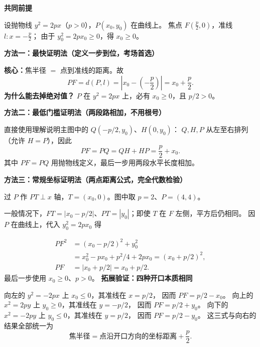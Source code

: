 \clearpage
\begin{proofbox}
  \textbf{\textcolor{CProof}{共同前提}}

  设抛物线 $y^2=2px$（$p>0$），$P(x_0,y_0)$ 在曲线上。
  焦点 $F(\frac p2,0)$，准线 $l:x=-\frac p2$；
  由于 $y_0^2=2px_0\ge0$，得 $x_0\ge0$。

  \medskip
  \textbf{\textcolor{CProof}{方法一：最快证明法（定义一步到位，考场首选）}}

  \textbf{核心：}焦半径 $=$ 点到准线的距离。故
  \[
    \boxed{PF=d(P,l)
    =\left|x_0-\left(-\frac p2\right)\right|
    =x_0+\frac p2}.
  \]
  \textbf{为什么能去掉绝对值？} $P$ 在 $y^2=2px$ 上，必有 $x_0\ge0$，且 $p/2>0$。



  \medskip
  \textbf{\textcolor{CProof}{方法二：最低门槛证明法（两段路相加，不用根号）}}


  直接使用理解说明主图中的 $Q(-p/2,y_0)$、$H(0,y_0)$：
  $Q,H,P$ 从左至右排列（允许 $H=P$），因此
  \[
    PF=PQ=QH+HP=\frac p2+x_0.
  \]
  其中 $PF=PQ$ 用抛物线定义，最后一步用两段水平长度相加。

  \medskip
\end{proofbox}
\clearpage
\begin{proofbox}
  \textbf{\textcolor{CProof}{方法三：常规坐标证明法（两点距离公式，完全代数检验）}}


  过 $P$ 作 $PT\perp x$ 轴，$T=(x_0,0)$。图中取 $p=2$、$P=(4,4)$。
  \begin{center}\end{center}
  一般情况下，$FT=|x_0-p/2|$、$PT=|y_0|$；即使 $T$ 在 $F$ 左侧，平方后仍相同。
  因 $P$ 在曲线上，代入 $y_0^2=2px_0$ 得


  \[
  \begin{aligned}
    PF^2&=(x_0-p/2)^2+y_0^2\\
        &=x_0^2-px_0+p^2/4+2px_0=(x_0+p/2)^2,\\
    PF&=|x_0+p/2|=\boxed{x_0+p/2}.
  \end{aligned}
  \]
  最后一步使用 $x_0\ge0$、$p>0$。
  \medskip
  \textbf{\textcolor{CProof}{拓展验证：四种开口本质相同}}

  向左的 $y^2=-2px$ 上 $x_0\le0$，其准线在 $x=p/2$，
  因而 $PF=p/2-x_0$。
  向上的 $x^2=2py$ 上 $y_0\ge0$，其准线在 $y=-p/2$，
  因而 $PF=p/2+y_0$。
  向下的 $x^2=-2py$ 上 $y_0\le0$，其准线在 $y=p/2$，
  因而 $PF=p/2-y_0$。
  这三式与向右的结果全部统一为
  \[
    \boxed{\text{焦半径}=
      \text{点沿开口方向的坐标距离}+\frac p2}.
  \]

\end{proofbox}
